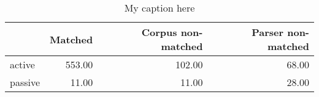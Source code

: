 \begin{table}[!ht]
\centering
\begin{tabular}{lrrr}
\toprule
{} &  Matched &  Corpus non-matched &  Parser non-matched \\
\midrule
active  &   553.00 &              102.00 &               68.00 \\
passive &    11.00 &               11.00 &               28.00 \\
\bottomrule
\end{tabular}
\caption{My caption here}
\label{tab:VOICE-ocd-data}
\end{table}